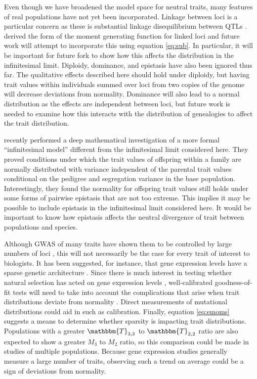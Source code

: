 Even though we have broadened the model space for neutral traits, many features
of real populations have not yet been incorporated. Linkage between loci is a
particular concern as these is substantial linkage disequilibrium between QTLs
\citep{Bulik-Sullivan2015}. \citet{Lohse2011} derived the form of the moment
generating function for linked loci and future work will attempt to incorporate
this using equation \eqref{eq:sub}. In particular, it will be important for
future fork to show how this affects the distribution in the infinitesimal
limit. Diploidy, dominance, and epistasis have also been ignored thus far. The
qualitative effects described here should hold under diploidy, but having trait
values within individuals summed over loci from two copies of the genome will
decrease deviations from normality. Dominance will also lead to a normal
distribution as the effects are independent between loci, but future work is
needed to examine how this interacts with the distribution of genealogies to
affect the trait distribution.

\citet{Barton2017} recently performed a deep mathematical investigation of a
more formal ``infinitesimal model'' different from the infinitesimal limit
considered here. They proved conditions under which the trait values of
offspring within a family are normally distributed with variance independent of
the parental trait values conditional on the pedigree and segregation variance
in the base population. Interestingly, they found the normality for offspring
trait values still holds under some forms of pairwise epistasis that are not too
extreme. This implies it may be possible to include epistasis in the
infinitesimal limit considered here. It would be important to know how epistasis
affects the neutral divergence of trait between populations and species.

Although GWAS of many traits have shown them to be controlled by large numbers
of loci \citep{Boyle2017}, this will not necessarily be the case for every trait
of interest to biologists. It has been suggested, for instance, that gene
expression levels have a sparse genetic architecture \citep{Wheeler2016}. Since
there is much interest in testing whether natural selection has acted on gene
expression levels \citep{Whitehead2006,Gilad2006,Yang2017}, well-calibrated
goodness-of-fit tests will need to take into account the complications that
arise when trait distributions deviate from normality \citep{Khaitovich2005}.
Direct measurements of mutational distributions \citep{Gruber2012,Metzger2016}
could aid in such as calibration. Finally, equation \eqref{eq:emoms} suggests a
means to determine whether sparsity is impacting trait distributions.
Populations with a greater $\mathbbm{T}_{3,3}$ to $\mathbbm{T}_{2,2}$ ratio are
also expected to show a greater $M_3$ to $M_2$ ratio, so this comparison could
be made in studies of multiple populations. Because gene expression studies
generally measure a large number of traits, observing such a trend on average
could be a sign of deviations from normality.

